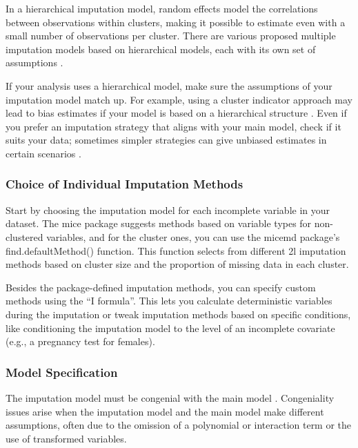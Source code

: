 \documentclass[
  article]{jss}
\begin{document}
In a hierarchical imputation model, random effects model the
correlations between observations within clusters, making it possible to
estimate even with a small number of observations per cluster. There are
various proposed multiple imputation models based on hierarchical
models, each with its own set of assumptions \cite{audigier}.

If your analysis uses a hierarchical model, make sure the assumptions of
your imputation model match up. For example, using a cluster indicator
approach may lead to bias estimates if your model is based on a
hierarchical structure \cite{taljaard2008,speidel2018}. Even if you
prefer an imputation strategy that aligns with your main model, check if
it suits your data; sometimes simpler strategies can give unbiased
estimates in certain scenarios \cite{bailey2020}.

\hypertarget{choice-of-individual-imputation-methods}{%
\subsubsection{Choice of Individual Imputation
Methods}\label{choice-of-individual-imputation-methods}}

Start by choosing the imputation model for each incomplete variable in
your dataset. The mice package suggests methods based on variable types
for non-clustered variables, and for the cluster ones, you can use the
micemd package's find.defaultMethod() function. This function selects
from different 2l imputation methods based on cluster size and the
proportion of missing data in each cluster.

Besides the package-defined imputation methods, you can specify custom
methods using the ``I formula''. This lets you calculate deterministic
variables during the imputation or tweak imputation methods based on
specific conditions, like conditioning the imputation model to the level
of an incomplete covariate (e.g., a pregnancy test for females).

\hypertarget{model-specification}{%
\subsubsection{Model Specification}\label{model-specification}}

The imputation model must be congenial with the main model
\cite{meng1994}. Congeniality issues arise when the imputation model and
the main model make different assumptions, often due to the omission of
a polynomial or interaction term or the use of transformed variables.
\end{document}
